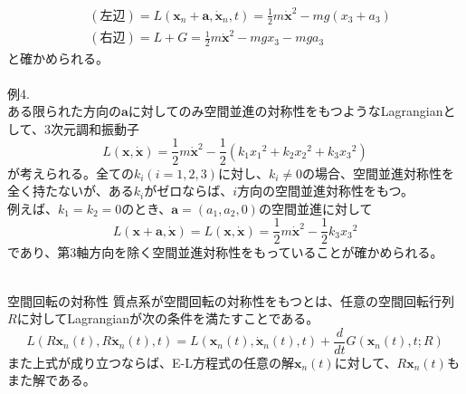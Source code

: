 \documentclass{jsarticle}
\begin{document}
\begin{align*}
&(左辺)=L(\bm{x}_{n}+\bm{a},\dot{\bm{x}}_{n},t)=\frac{1}{2}m\dot{\bm{x}}^{2}-mg(x_{3}+a_{3})\\
&(右辺)=L+G=\frac{1}{2}m\dot{\bm{x}}^{2}-mgx_{3}-mga_{3}
\end{align*}
と確かめられる。\\
\\
例4.\\
ある限られた方向の\(\bm{a}\)に対してのみ空間並進の対称性をもつようなLagrangianとして、\(3\)次元調和振動子
\[L(\bm{x},\dot{\bm{x}})=\frac{1}{2}m\dot{\bm{x}}^{2}-\frac{1}{2}\left(k_{1}{x_{1}}^{2}+k_{2}{x_{2}}^{2}+k_{3}{x_{3}}^{2}\right)\]
が考えられる。全ての\(k_{i}(i=1,2,3)\)に対し、\(k_{i}\ne0\)の場合、空間並進対称性を全く持たないが、ある\(k_{i}\)がゼロならば、\(i\)方向の空間並進対称性をもつ。\\
例えば、\(k_{1}=k_{2}=0\)のとき、\(\bm{a}=(a_{1},a_{2},0)\)の空間並進に対して
\[L(\bm{x}+\bm{a},\dot{\bm{x}})=L(\bm{x},\dot{\bm{x}})=\frac{1}{2}m\dot{\bm{x}}^{2}-\frac{1}{2}k_{3}{x_{3}}^{2}\]
であり、第\(3\)軸方向を除く空間並進対称性をもっていることが確かめられる。\\
\\
\begin{itembox}[l]{空間回転の対称性}
質点系が空間回転の対称性をもつとは、任意の空間回転行列\(R\)に対してLagrangianが次の条件を満たすことである。
\[L(R\bm{x}_{n}(t),R\dot{\bm{x}}_{n}(t),t)=L(\bm{x}_{n}(t),\dot{\bm{x}}_{n}(t),t)+\frac{d}{dt}G(\bm{x}_{n}(t),t;R)\]
また上式が成り立つならば、E-L方程式の任意の解\(\bm{x}_{n}(t)\)に対して、\(R\bm{x}_{n}(t)\)もまた解である。
\end{itembox}
\end{document}
